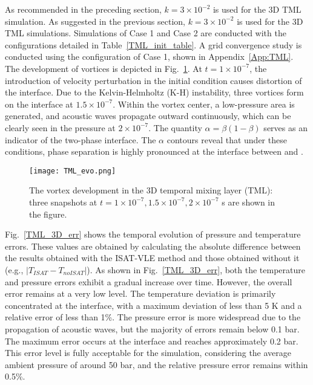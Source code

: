 As recommended in the preceding section, $k = 3\times 10^{-2}$ is used for the 3D TML simulation.
As suggested in the previous section, $k = 3\times 10^{-2}$ is used for the 3D TML simulations. Simulations of Case 1 and Case 2 are conducted with the configurations detailed in Table~\ref{TML_init_table}. A grid convergence study is conducted using the configuration of Case 1, shown in Appendix~\ref{App:TML}. The development of vortices is depicted in Fig.~\ref{TML_3D_evo}. At $t = 1\times 10^{-7}$, the introduction of velocity perturbation in the initial condition causes distortion of the interface. Due to the Kelvin-Helmholtz (K-H) instability, three vortices form on the interface at $1.5 \times 10^{-7}$. Within the vortex center, a low-pressure area is generated, and acoustic waves propagate outward continuously, which can be clearly seen in the pressure at $2\times 10^{-7}$. The quantity $\alpha=\beta(1-\beta)$ serves as an indicator of the two-phase interface. The $\alpha$ contours reveal that under these conditions, phase separation is highly pronounced at the interface between  and .%

\begin{figure}[htbp]
\centering
\texttt{[image: TML\_evo.png]}
\caption{The vortex development in the 3D temporal mixing layer (TML): three snapshots at $t = 1\times 10^{-7}, 1.5 \times 10^{-7}, 2\times 10^{-7}$ s are shown in the figure.}
\label{TML_3D_evo} 
\end{figure}

Fig.~\ref{TML_3D_err} shows the temporal evolution of pressure and temperature errors. These values are obtained by calculating the absolute difference between the results obtained with the ISAT-VLE method and those obtained without it (e.g., $|T_{ISAT}-T_{noISAT}|$). As shown in Fig.~\ref{TML_3D_err}, both the temperature and pressure errors exhibit a gradual increase over time. However, the overall error remains at a very low level. The temperature deviation is primarily concentrated at the interface, with a maximum deviation of less than 5 K and a relative error of less than 1\%. The pressure error is more widespread due to the propagation of acoustic waves, but the majority of errors remain below 0.1 bar. The maximum error occurs at the interface and reaches approximately 0.2 bar. This error level is fully acceptable for the simulation, considering the average ambient pressure of around 50 bar, and the relative pressure error remains within 0.5\%.



